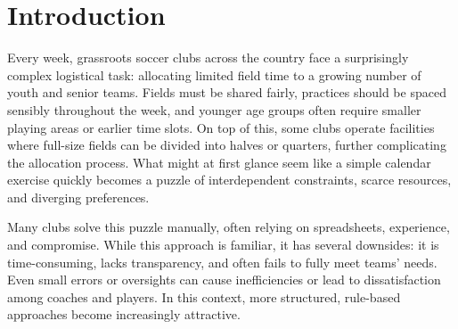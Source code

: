 \documentclass[12pt]{article}
\begin{document}
\begin{abstract}
This project investigates the applicability of constraint programming, specifically using Google's CP-SAT solver, to the scheduling of football training sessions in grassroots clubs. The core challenge lies in allocating a limited set of divisible field resources to multiple teams over a constrained weekly time grid, while satisfying hard constraints and optimising for preferences such as training spread and team co-location.

We model the problem using discrete time slots, hierarchical fields, and global constraints such as \texttt{NoOverlap} and \texttt{Cumulative}, enabling strong propagation. A case study based on real club data demonstrates that CP-SAT finds high-quality solutions efficiently, even under near-maximal utilisation. In the largest instance, a feasible solution is found in 3.6 seconds, and a near-optimal one within two minutes.

While the model performs well in discrete domains, it is sensitive to objective weight calibration and less suited to continuous or dynamic scheduling contexts. Nonetheless, the results show that constraint programming offers a scalable and interpretable framework for structured real-world planning problems.
\end{abstract}

\newpage


\renewcommand{\contentsname}{Table of content}


\tableofcontents
\newpage


\newpage


\section{Introduction}

Every week, grassroots soccer clubs across the country face a surprisingly complex logistical task: allocating limited field time to a growing number of youth and senior teams. Fields must be shared fairly, practices should be spaced sensibly throughout the week, and younger age groups often require smaller playing areas or earlier time slots. On top of this, some clubs operate facilities where full-size fields can be divided into halves or quarters, further complicating the allocation process. What might at first glance seem like a simple calendar exercise quickly becomes a puzzle of interdependent constraints, scarce resources, and diverging preferences.

Many clubs solve this puzzle manually, often relying on spreadsheets, experience, and compromise. While this approach is familiar, it has several downsides: it is time-consuming, lacks transparency, and often fails to fully meet teams' needs. Even small errors or oversights can cause inefficiencies or lead to dissatisfaction among coaches and players. In this context, more structured, rule-based approaches become increasingly attractive.
\\
\end{document}
